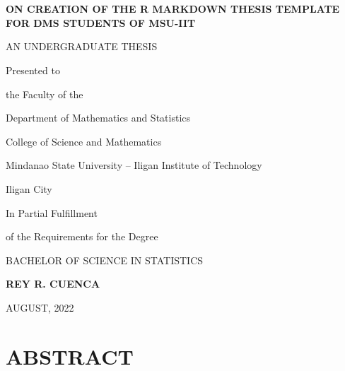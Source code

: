 \documentclass{source/tex/templates/maththesis}
\begin{document}
\setcounter{page}{1}


\chapter*{}

\phantom{xs}
\vspace{5pt}
\thispagestyle{empty}
\begin{center}
\large\textbf{ON CREATION OF THE R MARKDOWN THESIS TEMPLATE FOR DMS STUDENTS OF MSU-IIT} 
\end{center}

\vfill

\begin{center}
AN UNDERGRADUATE THESIS
\end{center}

\begin{center}
Presented to 

the Faculty of the 

Department of Mathematics and Statistics

College of Science and Mathematics

Mindanao State University -- Iligan Institute of Technology

Iligan City
\end{center}

\vfill

\begin{center}
In Partial Fulfillment

of the Requirements for the Degree

BACHELOR OF SCIENCE IN STATISTICS
\end{center}

\vfill

\begin{center}
\textbf{REY R. CUENCA}

AUGUST, 2022
\end{center}

\vspace{-1in}

\hypertarget{abstract-1}{%
\chapter*{ABSTRACT}\label{abstract-1}}
\end{document}
